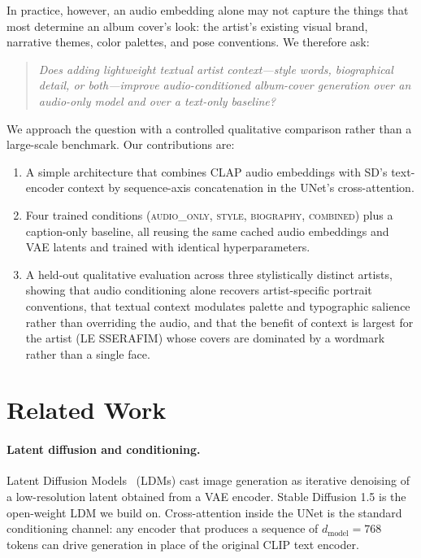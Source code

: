 \documentclass{article}
\begin{document}
In practice, however, an audio embedding alone may not capture the things
that most determine an album cover's look: the artist's existing visual
brand, narrative themes, color palettes, and pose conventions.
We therefore ask:
\begin{quote}
\emph{Does adding lightweight textual artist context---style words,
biographical detail, or both---improve audio-conditioned album-cover
generation over an audio-only model and over a text-only baseline?}
\end{quote}

We approach the question with a controlled qualitative comparison rather than
a large-scale benchmark. Our contributions are:
\begin{enumerate}
  \item A simple architecture that combines CLAP audio
    embeddings with SD's text-encoder context by sequence-axis concatenation
    in the UNet's cross-attention.
  \item Four trained conditions
    (\textsc{audio\_only}, \textsc{style}, \textsc{biography},
    \textsc{combined}) plus a caption-only baseline, all reusing the same
    cached audio embeddings and VAE latents and trained with identical
    hyperparameters.
  \item A held-out qualitative evaluation across three stylistically distinct
    artists, showing that audio conditioning alone recovers artist-specific
    portrait conventions, that textual context modulates palette and
    typographic salience rather than overriding the audio, and that the
    benefit of context is largest for the artist (LE SSERAFIM) whose covers
    are dominated by a wordmark rather than a single face.
\end{enumerate}

\section{Related Work}
\label{sec:related}

\paragraph{Latent diffusion and conditioning.}
Latent Diffusion Models~\citep{rombach2022high} (LDMs) cast image generation
as iterative denoising of a low-resolution latent obtained from a VAE
encoder. Stable Diffusion 1.5 is the open-weight LDM we build on. Cross-attention
inside the UNet is the standard conditioning channel: any encoder that produces
a sequence of $d_{\text{model}}=768$ tokens can drive generation in place of
the original CLIP text encoder.
\end{document}
